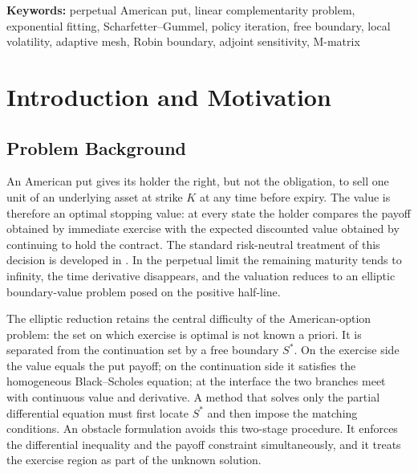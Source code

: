 \documentclass[11pt,a4paper]{article}
\theoremstyle{definition}
\theoremstyle{remark}
\begin{document}
\begin{abstract}
asymptotic Robin closure reduces the far-field error by up to three orders
of magnitude. A discrete adjoint formulation provides the sensitivities of
$V(100)$ to $\sigma$, $r$, and $q$ with one extra linear solve, matching
direct finite differences to $2\times10^{-9}$ and exact derivatives to
$0.31\%$. A controlled two-dimensional spread-put extension with $\rho=0$
retains the five-point M-matrix structure; its pricing-window error decreases
from $4.070\times10^{-2}$ to $1.611\times10^{-2}$ between $N=80$ and $N=160$,
and its value at $(100,50)$ changes by only $9.71\times10^{-4}$ when the domain
is enlarged from $L=300$ to $L=400$. The remaining limitations are the fully
front-fitted treatment of the free-boundary kink, the finite-domain
truncation of the production Dirichlet solve, and the restriction of the 2D
experiment to zero correlation with approximate high-price closures.
\end{abstract}

\noindent\raggedright\textbf{Keywords:} perpetual American put, linear complementarity
 problem, exponential fitting, Scharfetter--Gummel, policy iteration, free
 boundary, local volatility, adaptive mesh, Robin boundary, adjoint
 sensitivity, M-matrix

\tableofcontents
\newpage

\section{Introduction and Motivation}

\subsection{Problem Background}
An American put gives its holder the right, but not the obligation, to sell
one unit of an underlying asset at strike $K$ at any time before expiry. The
value is therefore an optimal stopping value: at every state the holder
compares the payoff obtained by immediate exercise with the expected
discounted value obtained by continuing to hold the contract. The standard
risk-neutral treatment of this decision is developed in
\cite{ref1,ref2}. In the perpetual limit the remaining maturity tends to
infinity, the time derivative disappears, and the valuation reduces to an
elliptic boundary-value problem posed on the positive half-line.

The elliptic reduction retains the central difficulty of the American-option
problem: the set on which exercise is optimal is not known a priori. It is
separated from the continuation set by a free boundary $S^*$. On the exercise
side the value equals the put payoff; on the continuation side it satisfies
the homogeneous Black--Scholes equation; at the interface the two branches
meet with continuous value and derivative. A method that solves only the
partial differential equation must first locate $S^*$ and then impose the
matching conditions. An obstacle formulation avoids this two-stage procedure.
It enforces the differential inequality and the payoff constraint
simultaneously, and it treats the exercise region as part of the unknown
solution.
\end{document}
